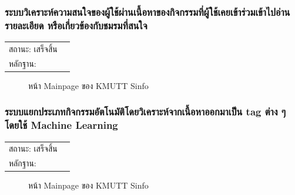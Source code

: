 \documentclass[14pt,oneside,openright,a4paper]{cpe-thai-project}
\begin{document}
\subsubsection{ระบบวิเคราะห์ความสนใจของผู้ใช้ผ่านเนื้อหาของกิจกรรมที่ผู้ใช้เคยเข้าร่วมเข้าไปอ่านรายละเอียด หรือเกี่ยวข้องกับชมรมที่สนใจ}
\begin{tabular}{@{}p{2cm}p{10cm}@{}}
  สถานะ: เสร็จสิ้น \\
  หลักฐาน: & \\
\end{tabular}
\begin{figure}[!h]\centering
  \setlength{\fboxrule}{0.5mm} %
  \setlength{\fboxsep}{0.5cm}
  \caption{หน้า Mainpage ของ KMUTT Sinfo}\label{fig:sinfo}
\end{figure}
\newpage
\subsubsection{ระบบแยกประเภทกิจกรรมอัตโนมัติโดยวิเคราะห์จากเนื้อหาออกมาเป็น tag ต่าง ๆ โดยใช้ Machine Learning}
\begin{tabular}{@{}p{2cm}p{10cm}@{}}
  สถานะ: เสร็จสิ้น \\
  หลักฐาน: & \\
\end{tabular}
\begin{figure}[!h]\centering
  \setlength{\fboxrule}{0.5mm} %
  \setlength{\fboxsep}{0.5cm}
  \caption{หน้า Mainpage ของ KMUTT Sinfo}\label{fig:sinfo}
\end{figure}
\newpage
\end{document}
